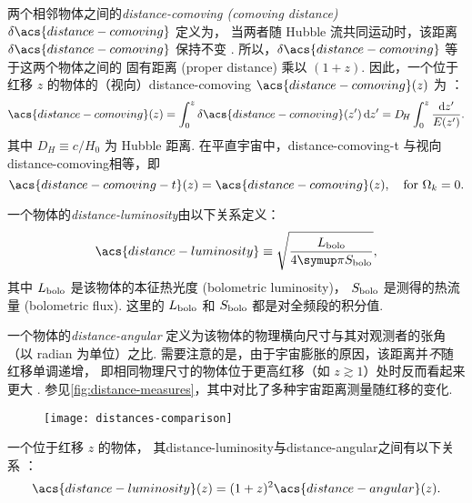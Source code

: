两个相邻物体之间的\emph{\acl{distance-comoving} (comoving distance)}
$\delta\acs{distance-comoving}$ 定义为，
当两者随 Hubble 流共同运动时，该距离 $\delta\acs{distance-comoving}$ 保持不变
\cite{hogg1999}.
所以，$\delta\acs{distance-comoving}$ 等于这两个物体之间的
固有距离 (proper distance) 乘以 $(1+z)$.
因此，一个位于红移 $z$ 的物体的（视向）\acl{distance-comoving}
$\acs{distance-comoving}(z)$ 为 \cite{hogg1999}：
\begin{equation}
  \label{eq:distance-comoving}
  \acs{distance-comoving}(z)
    = \int_0^z \delta\acs{distance-comoving}(z')\,\D{z'}
    = D_{\!H} \int_0^z \frac{\D{z'}}{E(z')} .
\end{equation}
其中 $D_{\!H} \equiv c / H_0$ 为 Hubble 距离.
在平直宇宙中，\acf{distance-comoving-t} 与视向\acl{distance-comoving}相等，即
\begin{equation}
  \label{eq:distance-comoving-t}
  \acs{distance-comoving-t}(z) = \acs{distance-comoving}(z),
    \quad \text{for } \Omega_k = 0 .
\end{equation}

一个物体的\emph{\acf{distance-luminosity}}由以下关系定义：
\begin{equation}
  \label{eq:dl-def}
  \acs{distance-luminosity} \equiv
    \sqrt{\frac{L_{\R{bolo}}}{4\Cpi S_{\R{bolo}}}} ,
\end{equation}
其中 $L_{\mathrm{bolo}}$ 是该物体的本征热光度 (bolometric luminosity)，
$S_{\mathrm{bolo}}$ 是测得的热流量 (bolometric flux).
这里的 $L_{\mathrm{bolo}}$ 和 $S_{\mathrm{bolo}}$ 都是对全频段的积分值.

一个物体的\emph{\acf{distance-angular}}
定义为该物体的物理横向尺寸与其对观测者的张角（以 \si{radian} 为单位）之比.
需要注意的是，由于宇宙膨胀的原因，该距离并\emph{不}随红移单调递增，
即相同物理尺寸的物体位于更高红移（如 $z \gtrsim 1$）处时反而看起来更大 \cite{hogg1999}.
参见\autoref{fig:distance-measures}，其中对比了多种宇宙距离测量随红移的变化.

\begin{figure}[tbp]
  \centering
  \texttt{[image: distances-comparison]}
  \label{fig:distance-measures}
\end{figure}

一个位于红移 $z$ 的物体，
其\acl{distance-luminosity}与\acl{distance-angular}之间有以下关系
\cite{weinberg1972,hogg1999,ellis2007}：
\begin{equation}
  \label{eq:dl-da}
  \acs{distance-luminosity}(z) = (1+z)^2 \acs{distance-angular}(z) .
\end{equation}


